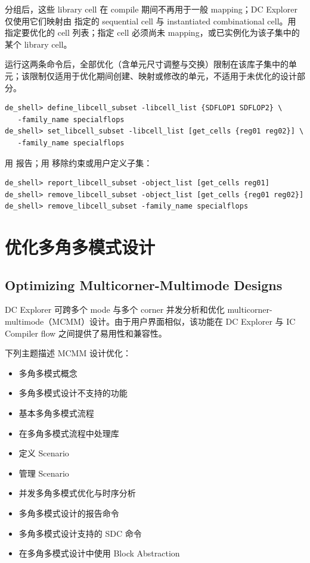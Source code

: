 分组后，这些 library cell 在 compile 期间不再用于一般 mapping；DC Explorer 仅使用它们映射由  指定的 sequential cell 与 instantiated combinational cell。用  指定要优化的 cell 列表；指定 cell 必须尚未 mapping，或已实例化为该子集中的某个 library cell。

运行这两条命令后，全部优化（含单元尺寸调整与交换）限制在该库子集中的单元；该限制仅适用于优化期间创建、映射或修改的单元，不适用于未优化的设计部分。

\begin{lstlisting}
de_shell> define_libcell_subset -libcell_list {SDFLOP1 SDFLOP2} \
   -family_name specialflops
de_shell> set_libcell_subset -libcell_list [get_cells {reg01 reg02}] \
   -family_name specialflops
\end{lstlisting}

用  报告；用  移除约束或用户定义子集：
\begin{lstlisting}
de_shell> report_libcell_subset -object_list [get_cells reg01]
de_shell> remove_libcell_subset -object_list [get_cells {reg01 reg02}]
de_shell> remove_libcell_subset -family_name specialflops
\end{lstlisting}

\section{优化多角多模式设计}
\subsection*{Optimizing Multicorner-Multimode Designs}

DC Explorer 可跨多个 mode 与多个 corner 并发分析和优化 multicorner-multimode（MCMM）设计。由于用户界面相似，该功能在 DC Explorer 与 IC Compiler flow 之间提供了易用性和兼容性。

下列主题描述 MCMM 设计优化：
\begin{itemize}
  \item 多角多模式概念
  \item 多角多模式设计不支持的功能
  \item 基本多角多模式流程
  \item 在多角多模式流程中处理库
  \item 定义 Scenario
  \item 管理 Scenario
  \item 并发多角多模式优化与时序分析
  \item 多角多模式设计的报告命令
  \item 多角多模式设计支持的 SDC 命令
  \item 在多角多模式设计中使用 Block Abstraction
\end{itemize}

